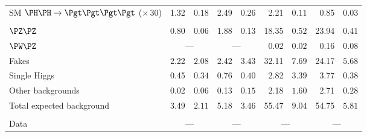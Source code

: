 \begin{table}[!h]
\begin{center}
\begin{scriptsize}
\begin{tabular}{lr@{ $\pm$ }lr@{ $\pm$ }lr@{ $\pm$ }lr@{ $\pm$ }l}
SM $\HH\rightarrow\tttt$  ($\times\,30$)&1.32&$0.18$&2.49&$0.26$&2.21&$0.11$&0.85&$0.03$\\
\\
$\PZ\PZ$&0.80&$0.06$&1.88&$0.13$&18.35&$0.52$&23.94&$0.41$\\
$\PW\PZ$& \multicolumn{2}{c}{---}  & \multicolumn{2}{c}{---}&0.02&$0.02$&0.16&$0.08$\\
Fakes&2.22&$2.08$&2.42&$3.43$&32.11&$7.69$&24.17&$5.68$\\
Single Higgs&0.45&$0.34$&0.76&$0.40$&2.82&$3.39$&3.77&$0.38$\\
Other backgrounds&0.02&$0.06$&0.13&$0.15$&2.18&$1.60$&2.71&$0.28$\\
Total expected background   &3.49&$2.11$&5.18&$3.46$&55.47&$9.04$&54.75&$5.81$\\
\\
Data& \multicolumn{2}{c}{---} & \multicolumn{2}{c}{---}& \multicolumn{2}{c}{---}& \multicolumn{2}{c}{---}\\


\end{tabular}
\end{scriptsize}
\end{center}
\end{table}

